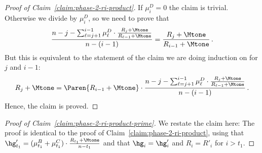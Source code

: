 \begin{proof}[Proof of Claim~\ref{claim:phase-2-ri-product}]
    If $\mu_i^D = 0$ the claim is trivial. Otherwise we divide by $\mu_i^D$, so we need to prove that
    \begin{equation*}\frac{ n - j - \sum_{\ell = j + 1}^{i-1} \mu_{\ell}^D \cdot \frac{R_j + \Mtone}{R_{\ell - 1} + \Mtone}}{n - (i - 1)} = \frac{R_{j}+\Mtone}{R_{i-1}+\Mtone}\,.\end{equation*}
    But this is equivalent to the statement of the claim we are doing induction on for $j$ and $i-1$:
    \begin{equation*}R_{j}+\Mtone = \Paren{R_{i-1}+\Mtone} \cdot \frac{n - j - \sum_{\ell=j+1}^{i-1} \mu_\ell^D \cdot \frac{R_j+\Mtone}{R_{\ell-1}+\Mtone}}{n - (i - 1)}\,.\end{equation*}
    Hence, the claim is proved.
\end{proof}

\begin{proof}[Proof of Claim~\ref{claim:phase-2-ri-product-prime}]
    We restate the claim here:
    \claimphasetworiproductprime*
    The proof is identical to the proof of Claim~\ref{claim:phase-2-ri-product}, using that $\hg'_{t_1} = (\mu_{t_1}^B + \mu_{t_1}^C) \cdot \frac{R_{t_1}+\Mtone}{n-t_1}$ and that $\hg_i = \hg'_i$ and $R_i = R'_i$ for $i > t_1$.
\end{proof}
